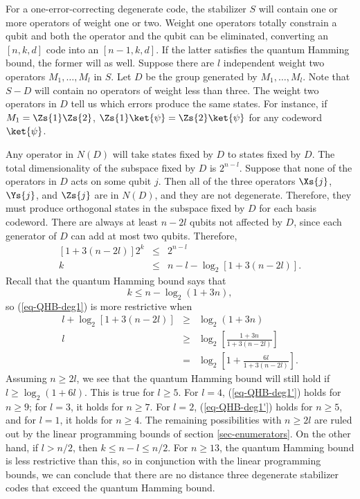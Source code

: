 For a one-error-correcting degenerate code, the stabilizer $S$ will contain
one or more operators of weight one or two.  Weight one operators totally
constrain a qubit and both the operator and the qubit can be eliminated,
converting an $[n, k, d]$ code into an $[n-1, k, d]$.  If the latter satisfies
the quantum Hamming bound, the former will as well.  Suppose there are $l$
independent weight two operators $M_1, \ldots, M_l$ in $S$.  Let $D$ be the
group generated by $M_1, \ldots, M_l$.  Note that $S - D$ will contain no
operators of weight less than three.  The weight two operators in $D$ tell us
which errors produce the same states.  For instance, if $M_1 = \Zs{1} \Zs{2}$,
$\Zs{1} \ket{\psi} = \Zs{2} \ket{\psi}$ for any codeword $\ket{\psi}$.

Any operator in $N(D)$ will take states fixed by $D$ to states fixed by $D$.
The total dimensionality of the subspace fixed by $D$ is $2^{n-l}$.  Suppose
that none of the operators in $D$ acts on some qubit $j$.  Then all of the
three operators $\Xs{j}$, $\Ys{j}$, and $\Zs{j}$ are in $N(D)$, and they are
not degenerate.  Therefore, they must produce orthogonal states in the
subspace fixed by $D$ for each basis codeword.  There are always at least
$n-2l$ qubits not affected by $D$, since each generator of $D$ can add at
most two qubits.  Therefore,
\begin{eqnarray}
	\left[1 + 3(n-2l) \right] 2^k & \leq & 2^{n-l} \\
	k & \leq & n - l - \log_2 [1+3(n-2l)]. \label{eq-QHB-deg1}
\end{eqnarray}
Recall that the quantum Hamming bound says that
\begin{equation}
	k \leq n - \log_2 (1+3n),
\end{equation}
so (\ref{eq-QHB-deg1}) is more restrictive when
\begin{eqnarray}
	l + \log_2 [1+3(n-2l)] & \geq & \log_2 (1+3n) \\
	l & \geq & \log_2 \left[ \frac{1+3n}{1+3(n-2l)} \right] \\
	& = & \log_2 \left[ 1 + \frac{6l}{1 + 3(n-2l)} \right]. \label{eq-QHB-deg1'}
\end{eqnarray}
Assuming $n \geq 2l$, we see that the quantum Hamming bound will still
hold if $l \geq \log_2 (1+6l)$.  This is true for $l \geq 5$.  For $l=4$,
(\ref{eq-QHB-deg1'}) holds for $n \geq 9$; for $l=3$, it holds for $n \geq
7$.  For $l=2$, (\ref{eq-QHB-deg1'}) holds for $n \geq 5$, and for $l=1$, it
holds for $n \geq 4$.  The remaining possibilities with $n \geq 2l$ are
ruled out by the linear programming bounds of section
\ref{sec-enumerators}.  On the other hand, if $l > n/2$, then $k \leq n-l
\leq n/2$.  For $n \geq 13$, the quantum Hamming bound is less
restrictive than this, so in conjunction with the linear programming
bounds, we can conclude that there are no distance three degenerate stabilizer
codes that exceed the quantum Hamming bound.

